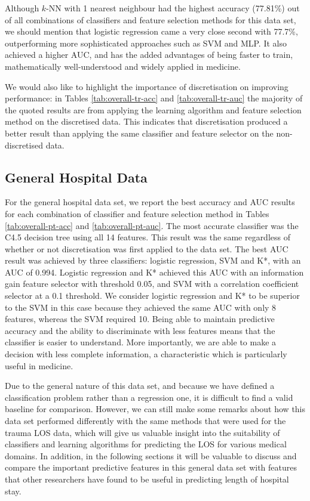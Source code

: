 Although $k$-NN with 1 nearest neighbour had the highest accuracy (77.81\%) out
of all combinations of classifiers and feature selection methods for this data
set, we should mention that logistic regression came a very close second with
77.7\%, outperforming more sophisticated approaches such as SVM and MLP. It
also achieved a higher AUC, and has the added advantages of being faster to
train, mathematically well-understood and widely applied in medicine.

We would also like to highlight the importance of discretisation on improving
performance: in Tables \ref{tab:overall-tr-acc} and
\ref{tab:overall-tr-auc} the majority of the quoted results are from applying
the learning algorithm and feature selection method on the discretised data.
This indicates that discretisation produced a better result than applying the
same classifier and feature selector on the non-discretised data.

\subsection{General Hospital Data}
For the general hospital data set, we report the best accuracy and AUC results
for each combination of classifier and feature selection method in Tables
\ref{tab:overall-pt-acc} and \ref{tab:overall-pt-auc}. The most accurate
classifier was the C4.5 decision tree using all 14 features.
This result was the same
regardless of whether or not discretisation was first applied to the data set.
The best AUC result was achieved by three classifiers: logistic regression, SVM
and K*, with an AUC of 0.994. Logistic regression and K* achieved this AUC with
an information gain feature selector with threshold 0.05, and SVM with a
correlation coefficient selector at a 0.1 threshold. We consider logistic
regression and K* to be superior to the SVM in this case because they achieved
the same AUC with only 8 features, whereas the SVM required 10. Being able to
maintain predictive accuracy and the ability to discriminate with less features
means that the classifier is easier to understand. More importantly, we are
able to make a decision with less complete information, a characteristic
which is particularly useful in medicine.




Due to the general nature of this data set, and because we have defined a
classification problem rather than a regression one, it is difficult to find a
valid baseline for comparison. However, we can still make some remarks about
how this data set performed differently with the same methods that were used
for the trauma LOS data, which will give us valuable insight into the
suitability of classifiers and learning algorithms for predicting the LOS for
various medical domains. In addition, in the following sections it will be
valuable to discuss and compare the important predictive features in this
general data set with features that other researchers have found to be
useful in predicting length of hospital stay.

